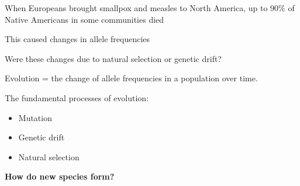 \documentclass[14pt,table]{beamer}
\begin{document}
\begin{frame}
\begin{adjustwidth}{-1.5em}{-1.5em}
    When Europeans brought smallpox and measles to North America, up to 90\% of
    Native Americans in some communities died

    \vspace{1cm}
    This caused changes in allele frequencies

    \vspace{1cm}
    Were these changes due to natural selection or genetic drift?
\end{adjustwidth}
\end{frame}


\begin{frame}
\begin{adjustwidth}{-1.5em}{-1.5em}
    Evolution = the change of allele frequencies in a population over time.

    \vspace{5mm}
    The fundamental processes of evolution:
    \begin{itemize}
        \item Mutation
        \item Genetic drift
        \item Natural selection
    \end{itemize}



\end{adjustwidth}
\end{frame}

\begin{frame}
    \begin{center}
        {\LARGE\bf How do new species form?}
    \end{center}
\end{frame}
\end{document}
